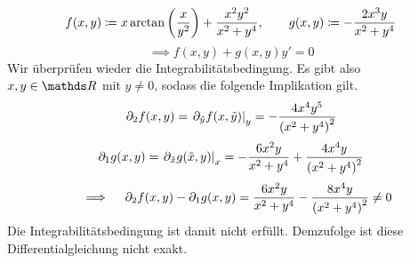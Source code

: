 \begin{atiSolution}
\begin{atiSubtaskSolutions}
{\begin{atiSubtaskSolutions}
{          \[
            f(x,y) \coloneqq x\arctan\left( \frac{x}{y^2} \right) + \frac{x^2y^2}{x^2+y^4} ,\qquad g(x,y) \coloneqq -\frac{2x^3y}{x^2+y^4}
          \]
          \[
            \implies f(x,y) + g(x,y)y' = 0
          \]
          Wir überprüfen wieder die Integrabilitätsbedingung.
          Es gibt also $x,y\in\setR$ mit $y\neq 0$, sodass die folgende Implikation gilt.
          \[
            \partial_2f(x,y) = \left.\partial_{\tilde{y}} f(x,\tilde{y})\right\vert_{y}^{} = -\frac{4x^4y^5}{\left( x^2+y^4 \right)^2}
          \]
          \[
            \partial_1g(x,y) = \left.\partial_{\tilde{x}} g(\tilde{x},y)\right\vert_{x}^{} = -\frac{6x^2y}{x^2+y^4} + \frac{4x^4y}{\left( x^2+y^4 \right)^2}
          \]
          \[
            \implies \partial_2f(x,y) - \partial_1g(x,y) = \frac{6x^2y}{x^2+y^4} - \frac{8x^4y}{\curvb{x^2+y^4}^2} \neq 0
          \]
          Die Integrabilitätsbedingung ist damit nicht erfüllt.
          Demzufolge ist diese Differentialgleichung nicht exakt.
        }
      \end{atiSubtaskSolutions}
    }
  \end{atiSubtaskSolutions}
\end{atiSolution}
